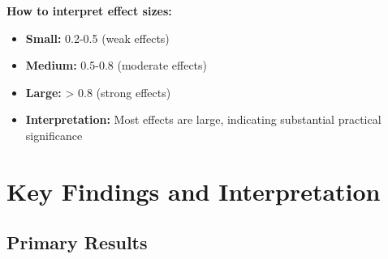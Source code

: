 \documentclass[11pt]{article}
\begin{document}
\textbf{How to interpret effect sizes:}
\begin{itemize}
    \item \textbf{Small:} 0.2-0.5 (weak effects)
    \item \textbf{Medium:} 0.5-0.8 (moderate effects)
    \item \textbf{Large:} > 0.8 (strong effects)
    \item \textbf{Interpretation:} Most effects are large, indicating substantial practical significance
\end{itemize}

\section{Key Findings and Interpretation}

\subsection{Primary Results}
\end{document}
